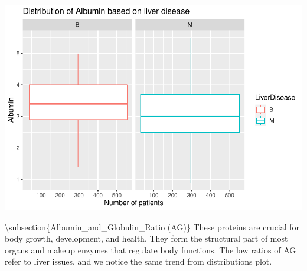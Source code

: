 \documentclass[]{article}
\newenvironment{Shaded}{\begin{snugshade}}{\end{snugshade}}
\newcommand{\CommentTok}[1]{\textcolor[rgb]{0.56,0.35,0.01}{\textit{#1}}}
\newcommand{\DataTypeTok}[1]{\textcolor[rgb]{0.13,0.29,0.53}{#1}}
\newcommand{\KeywordTok}[1]{\textcolor[rgb]{0.13,0.29,0.53}{\textbf{#1}}}
\newcommand{\NormalTok}[1]{#1}
\newcommand{\OperatorTok}[1]{\textcolor[rgb]{0.81,0.36,0.00}{\textbf{#1}}}
\newcommand{\StringTok}[1]{\textcolor[rgb]{0.31,0.60,0.02}{#1}}
\begin{document}
\begin{Shaded}
\end{Shaded}

\includegraphics{LiverDisease_files/figure-latex/unnamed-chunk-22-1.pdf}

\textbackslash subsection\{Albumin\_and\_Globulin\_Ratio (AG)\} These
proteins are crucial for body growth, development, and health. They form
the structural part of most organs and makeup enzymes that regulate body
functions. The low ratios of AG refer to liver issues, and we notice the
same trend from distributions plot.
\end{document}
